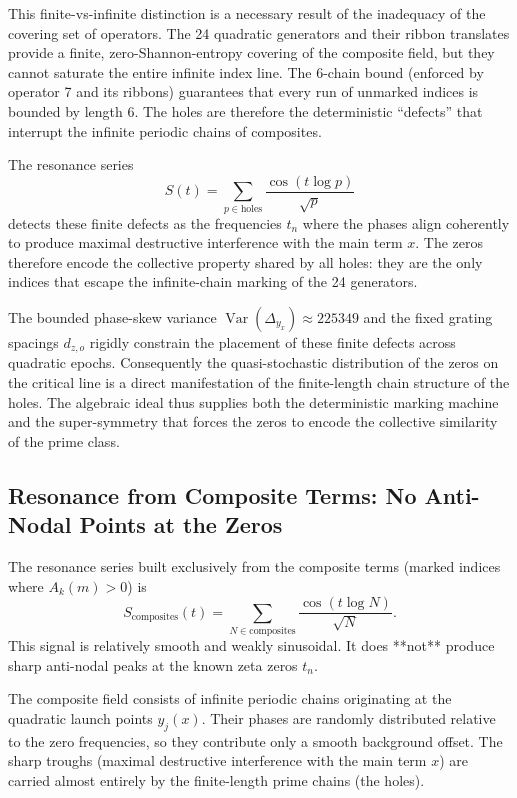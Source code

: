 \documentclass[11pt,a4paper]{article}
\begin{document}
This finite-vs-infinite distinction is a necessary result of the inadequacy of the covering set of operators. The 24 quadratic generators and their ribbon translates provide a finite, zero-Shannon-entropy covering of the composite field, but they cannot saturate the entire infinite index line. The 6-chain bound (enforced by operator 7 and its ribbons) guarantees that every run of unmarked indices is bounded by length 6. The holes are therefore the deterministic “defects” that interrupt the infinite periodic chains of composites.

The resonance series
\[
S(t)=\sum_{p\in\text{holes}}\frac{\cos(t\log p)}{\sqrt{p}}
\]
detects these finite defects as the frequencies \(t_n\) where the phases align coherently to produce maximal destructive interference with the main term \(x\). The zeros therefore encode the collective property shared by all holes: they are the only indices that escape the infinite-chain marking of the 24 generators.

The bounded phase-skew variance \(\operatorname{Var}(\Delta_{y_x})\approx225349\) and the fixed grating spacings \(d_{z,o}\) rigidly constrain the placement of these finite defects across quadratic epochs. Consequently the quasi-stochastic distribution of the zeros on the critical line is a direct manifestation of the finite-length chain structure of the holes. The algebraic ideal thus supplies both the deterministic marking machine and the super-symmetry that forces the zeros to encode the collective similarity of the prime class.

\subsection{Resonance from Composite Terms: No Anti-Nodal Points at the Zeros}

The resonance series built exclusively from the composite terms (marked indices where \(A_k(m)>0\)) is
\[
S_{\text{composites}}(t)=\sum_{N\in\text{composites}}\frac{\cos(t\log N)}{\sqrt{N}}.
\]
This signal is relatively smooth and weakly sinusoidal. It does **not** produce sharp anti-nodal peaks at the known zeta zeros \(t_n\).

The composite field consists of infinite periodic chains originating at the quadratic launch points \(y_j(x)\). Their phases are randomly distributed relative to the zero frequencies, so they contribute only a smooth background offset. The sharp troughs (maximal destructive interference with the main term \(x\)) are carried almost entirely by the finite-length prime chains (the holes).
\end{document}
